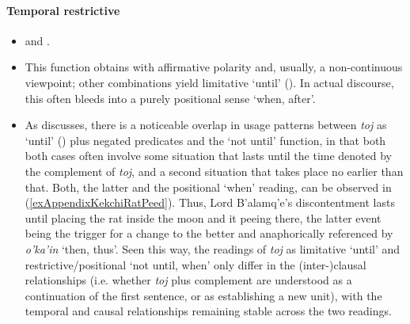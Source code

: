 \paragraph{Temporal restrictive}\label{appendixKekchiRestrictive}
\begin{itemize}
	\item \textcite[171]{VocabularioKechi2004} and \textcite{Kockelman2020}.
	\item This function obtains with affirmative polarity and, usually, a non-continuous viewpoint; other combinations yield limitative \lq until\rq{ }(). In actual discourse, this often bleeds into a purely positional sense \lq when, after\rq{}.
	
	\item As \textcite{Kockelman2020} discusses, there is a noticeable overlap in usage patterns between \textit{toj} as \lq until\rq{ }() plus negated predicates and the \lq not until\rq{ }function, in that both both cases often involve some situation that lasts until the time denoted by the complement of \textit{toj}, and a second situation that takes place no earlier than that. Both, the latter and the positional \lq when\rq{ }reading, can be observed in (\ref{exAppendixKekchiRatPeed}). Thus, Lord B’alamq’e's discontentment lasts until placing the rat inside the moon and it peeing there, the latter event being the trigger for a change to the better and anaphorically referenced by \textit{o\rq{}ka\rq{}in} \lq then, thus\rq{}. Seen this way, the readings of \textit{toj} as limitative \lq until\rq{ }and restrictive/positional \lq not until, when\rq{ }only differ in the (inter-)clausal relationships (i.e. whether \textit{toj} plus complement are understood as a continuation of the first sentence, or as establishing a new unit), with the temporal and causal relationships remaining stable across the two readings.
\end{itemize}

